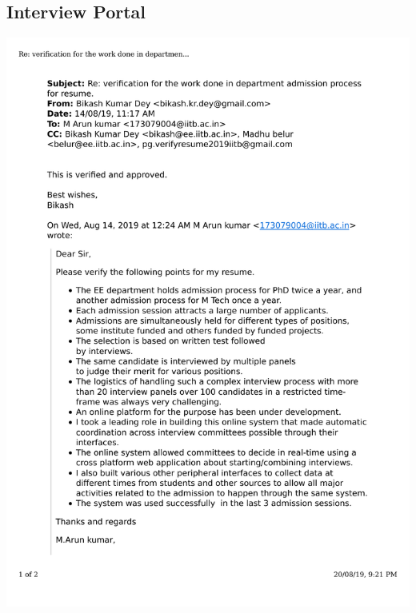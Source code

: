 \documentclass{article}
\begin{document}
	\subsection{Interview Portal}
		\includegraphics[page=1, scale=0.5]{proofs/Interview_portal.pdf}\\
\end{document}
